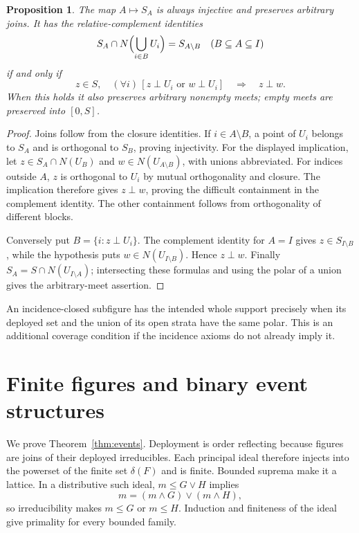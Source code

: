 \documentclass[11pt,a4paper]{article}
\newtheorem{proposition}[theorem]{Proposition}
\theoremstyle{definition}
\begin{document}
\begin{proposition}\label{prop:figure}
The map $A\mapsto S_A$ is always injective and preserves arbitrary joins. It has the relative-complement identities
\[
 S_A\cap N\Bigl(\bigcup_{i\in B}U_i\Bigr)=S_{A\setminus B}
 \quad(B\subseteq A\subseteq I)
\]
if and only if
\[
 z\in S,\quad (\forall i)\,[z\perp U_i\text{ or }w\perp U_i]
 \quad\Longrightarrow\quad z\perp w.
\]
When this holds it also preserves arbitrary nonempty meets; empty meets are preserved into $[0,S]$.
\end{proposition}
\begin{proof}
Joins follow from the closure identities. If $i\in A\setminus B$, a point of $U_i$ belongs to $S_A$ and is orthogonal to $S_B$, proving injectivity. For the displayed implication, let $z\in S_A\cap N(U_B)$ and $w\in N(U_{A\setminus B})$, with unions abbreviated. For indices outside $A$, $z$ is orthogonal to $U_i$ by mutual orthogonality and closure. The implication therefore gives $z\perp w$, proving the difficult containment in the complement identity. The other containment follows from orthogonality of different blocks.

Conversely put $B=\{i:z\perp U_i\}$. The complement identity for $A=I$ gives $z\in S_{I\setminus B}$, while the hypothesis puts $w\in N(U_{I\setminus B})$. Hence $z\perp w$. Finally $S_A=S\cap N(U_{I\setminus A})$; intersecting these formulas and using the polar of a union gives the arbitrary-meet assertion.
\end{proof}
An incidence-closed subfigure has the intended whole support precisely when its deployed set and the union of its open strata have the same polar. This is an additional coverage condition if the incidence axioms do not already imply it.







\section{Finite figures and binary event structures}\label{sec:events}
We prove Theorem~\ref{thm:events}. Deployment is order reflecting because figures are joins of their deployed irreducibles. Each principal ideal therefore injects into the powerset of the finite set $\delta(F)$ and is finite. Bounded suprema make it a lattice. In a distributive such ideal, $m\le G\vee H$ implies
\[
 m=(m\wedge G)\vee(m\wedge H),
\]
so irreducibility makes $m\le G$ or $m\le H$. Induction and finiteness of the ideal give primality for every bounded family.
\end{document}
